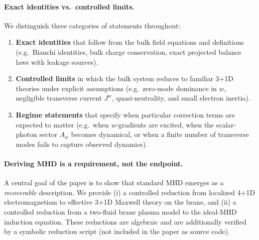 \documentclass[11pt]{article}
\begin{document}
\paragraph{Exact identities vs.\ controlled limits.}
We distinguish three categories of statements throughout:
\begin{enumerate}[leftmargin=1.5em]
\item \textbf{Exact identities} that follow from the bulk field equations and definitions (e.g.\ Bianchi identities, bulk charge conservation, exact projected balance laws with leakage sources).
\item \textbf{Controlled limits} in which the bulk system reduces to familiar 3+1D theories under explicit assumptions (e.g.\ zero-mode dominance in \(w\), negligible transverse current \(J^w\), quasi-neutrality, and small electron inertia).
\item \textbf{Regime statements} that specify when particular correction terms are expected to matter (e.g.\ when \(w\)-gradients are excited, when the scalar-photon sector \(A_w\) becomes dynamical, or when a finite number of transverse modes fails to capture observed dynamics).
\end{enumerate}

\paragraph{Deriving MHD is a requirement, not the endpoint.}
A central goal of the paper is to show that standard MHD emerges as a \emph{recoverable} description. We provide (i) a controlled reduction from localized 4+1D electromagnetism to effective 3+1D Maxwell theory on the brane, and (ii) a controlled reduction from a two-fluid brane plasma model to the ideal-MHD induction equation. These reductions are algebraic and are additionally verified by a symbolic reduction script (not included in the paper as source code).
\end{document}
